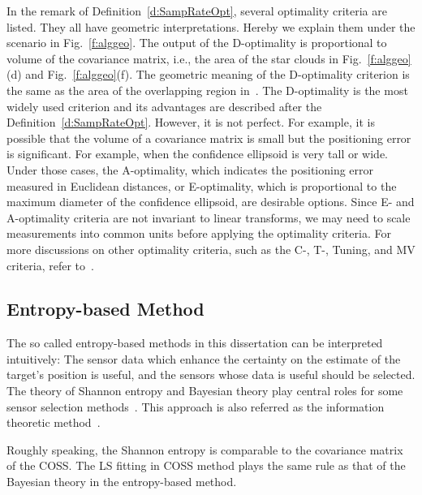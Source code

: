 In the remark of Definition~\ref{d:SampRateOpt}, several optimality criteria are listed. They all have geometric interpretations. Hereby we explain them under the scenario in Fig.~\ref{f:alggeo}.
    The output of the D-optimality is proportional to volume of the covariance matrix, i.e., the area of the star clouds in Fig.~\ref{f:alggeo}(d) and Fig.~\ref{f:alggeo}(f). The geometric meaning of the D-optimality criterion is the same as the area of the overlapping region in~\cite{isler06tase}.
The D-optimality is the most widely used criterion and its advantages are described after the Definition~\ref{d:SampRateOpt}. However, it is not perfect. For example,  it is possible that the volume of a covariance matrix is small but the positioning error is significant. For example, when the confidence ellipsoid is very tall or wide. Under those cases, the A-optimality, which indicates the positioning error measured in Euclidean distances, or E-optimality, which is proportional to the maximum diameter of the confidence ellipsoid, are desirable options. Since E- and A-optimality criteria are not invariant to linear transforms, we may need to scale measurements into common units before applying the optimality criteria. For more discussions on other optimality criteria, such as the C-, T-, Tuning, and MV criteria, refer to~\cite{EmeryOED98,UcinskiCDC05}.


\subsection{Entropy-based Method}
The so called entropy-based methods in this dissertation can be interpreted intuitively: The sensor data which enhance the certainty on the estimate of the target's position is useful, and the sensors whose data is useful should be selected.
    The theory of Shannon entropy and Bayesian theory play central roles for some sensor selection methods~\cite{liu02collaborative,FZhaoShinInfoDrivenDynamicTracking,zhao03collaborative,wang04entropybased,ErtinMaxMutualInfoIpsn03}.
This approach is also referred as the information theoretic method~\cite{wang04entropybased}.

Roughly speaking, the Shannon entropy is comparable to the covariance matrix of the COSS. The LS fitting in COSS method plays the same rule as that of the Bayesian theory in the entropy-based method.

